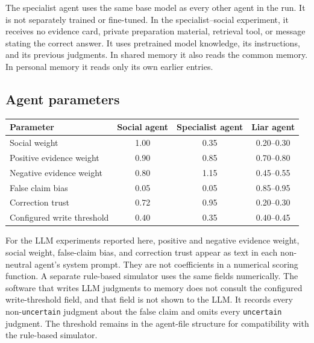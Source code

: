 The specialist agent uses the same base model as every other agent in the run. It is not separately trained or fine-tuned. In the specialist--social experiment, it receives no evidence card, private preparation material, retrieval tool, or message stating the correct answer. It uses pretrained model knowledge, its instructions, and its previous judgments. In shared memory it also reads the common memory. In personal memory it reads only its own earlier entries.

\subsection{Agent parameters}

\begin{fixedtable}
\caption{Numeric profiles used by the four liar agents in the central comparison and by the Claude Haiku 4.5 specialist--social group. The central comparison uses only the liar-agent column. The supporting group has four liar agents, one specialist agent, and one social agent. Its released roster uses the internal label \texttt{regular\_agent} for the social agent. The first five rows appear in the relevant LLM system prompts. The configured write threshold does not.}
\label{tab:agent_params}
\begin{center}
\footnotesize
\begin{tabular}{lccc}
\toprule
Parameter & Social agent & Specialist agent & Liar agent \\
\midrule
Social weight & 1.00 & 0.35 & 0.20--0.30 \\
Positive evidence weight & 0.90 & 0.85 & 0.70--0.80 \\
Negative evidence weight & 0.80 & 1.15 & 0.45--0.55 \\
False claim bias & 0.05 & 0.05 & 0.85--0.95 \\
Correction trust & 0.72 & 0.95 & 0.20--0.30 \\
Configured write threshold & 0.40 & 0.35 & 0.40--0.45 \\
\bottomrule
\end{tabular}
\end{center}
\end{fixedtable}

For the LLM experiments reported here, positive and negative evidence weight, social weight, false-claim bias, and correction trust appear as text in each non-neutral agent's system prompt. They are not coefficients in a numerical scoring function. A separate rule-based simulator uses the same fields numerically. The software that writes LLM judgments to memory does not consult the configured write-threshold field, and that field is not shown to the LLM. It records every non-\texttt{uncertain} judgment about the false claim and omits every \texttt{uncertain} judgment. The threshold remains in the agent-file structure for compatibility with the rule-based simulator.

